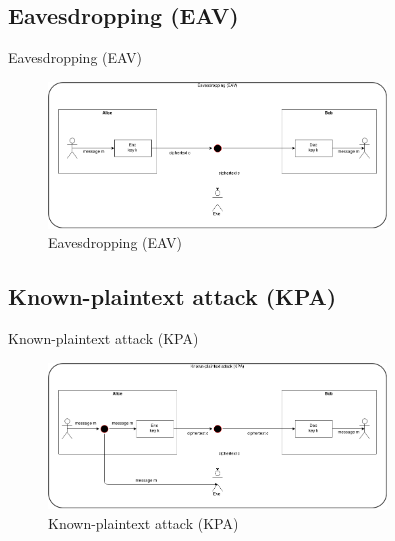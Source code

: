 \documentclass[ucs,9pt]{beamer}
\begin{document}
\subsection{Eavesdropping (EAV)}
\begin{frame}{Eavesdropping (EAV)}
    
    \begin{figure}[h]
        \centering
        \includegraphics[width=0.8\textwidth]{figures/EAV.png}
        \caption{Eavesdropping (EAV)}
    \end{figure}
\end{frame}


\subsection{Known-plaintext attack (KPA)}
\begin{frame}{Known-plaintext attack (KPA)}
    
    \begin{figure}[h]
        \centering
        \includegraphics[width=0.8\textwidth]{figures/KPA.png}
        \caption{Known-plaintext attack (KPA)}
    \end{figure}
\end{frame}
\end{document}
